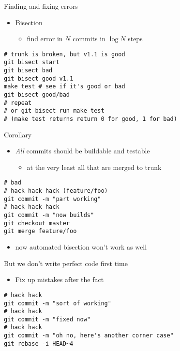 \documentclass[presentation]{beamer}
\begin{document}
\begin{frame}[fragile,label=sec-1-7]{Finding and fixing errors}
 \begin{itemize}
\item Bisection
\begin{itemize}
\item find error in $N$ commits in $\log{N}$ steps
\end{itemize}
\end{itemize}
\begin{verbatim}
# trunk is broken, but v1.1 is good
git bisect start
git bisect bad
git bisect good v1.1
make test # see if it's good or bad
git bisect good/bad
# repeat
# or git bisect run make test
# (make test returns return 0 for good, 1 for bad)
\end{verbatim}
\end{frame}
\begin{frame}[fragile,label=sec-1-8]{Corollary}
 \begin{itemize}
\item \emph{All} commits should be buildable and testable
\begin{itemize}
\item at the very least all that are merged to trunk
\end{itemize}
\end{itemize}
\begin{verbatim}
# bad
# hack hack hack (feature/foo)
git commit -m "part working"
# hack hack hack
git commit -m "now builds"
git checkout master
git merge feature/foo
\end{verbatim}
\begin{itemize}
\item now automated bisection won't work as well
\end{itemize}
\end{frame}
\begin{frame}[fragile,label=sec-1-9]{But we don't write perfect code first time}
 \begin{itemize}
\item Fix up mistakes after the fact
\end{itemize}
\begin{verbatim}
# hack hack
git commit -m "sort of working"
# hack hack
git commit -m "fixed now"
# hack hack
git commit -m "oh no, here's another corner case"
git rebase -i HEAD~4
\end{verbatim}
\end{frame}
\end{document}
